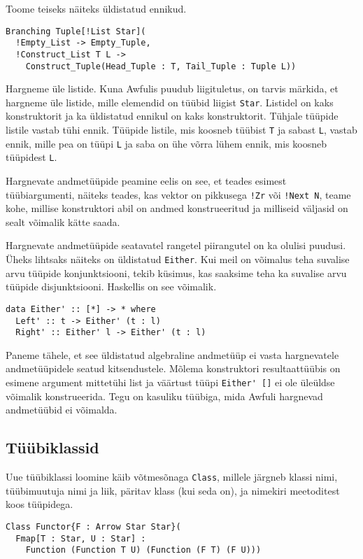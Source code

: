 \documentclass[12pt]{article}
\begin{document}
        Toome teiseks näiteks üldistatud ennikud.

        \begin{verbatim}Branching Tuple[!List Star](
  !Empty_List -> Empty_Tuple,
  !Construct_List T L ->
    Construct_Tuple(Head_Tuple : T, Tail_Tuple : Tuple L))\end{verbatim}

        Hargneme üle listide. Kuna Awfulis puudub liigituletus, on tarvis märkida, et hargneme üle listide, mille elemendid on tüübid liigist \verb!Star!. Listidel on kaks konstruktorit ja ka üldistatud ennikul on kaks konstruktorit. Tühjale tüüpide listile vastab tühi ennik. Tüüpide listile, mis koosneb tüübist \verb!T! ja sabast \verb!L!, vastab ennik, mille pea on tüüpi \verb!L! ja saba on ühe võrra lühem ennik, mis koosneb tüüpidest \verb!L!.

        Hargnevate andmetüüpide peamine eelis on see, et teades esimest tüübiargumenti, näiteks teades, kas vektor on pikkusega \verb"!Zr" või \verb"!Next N", teame kohe, millise konstruktori abil on andmed konstrueeritud ja milliseid väljasid on sealt võimalik kätte saada.

        Hargnevate andmetüüpide seatavatel rangetel piirangutel on ka olulisi puudusi. Üheks lihtsaks näiteks on üldistatud \verb!Either!. Kui meil on võimalus teha suvalise arvu tüüpide konjunktsiooni, tekib küsimus, kas saaksime teha ka suvalise arvu tüüpide disjunktsiooni. Haskellis on see võimalik.

        \begin{verbatim}data Either' :: [*] -> * where
  Left' :: t -> Either' (t : l)
  Right' :: Either' l -> Either' (t : l)\end{verbatim}

        Paneme tähele, et see üldistatud algebraline andmetüüp ei vasta hargnevatele andmetüüpidele seatud kitsendustele. Mõlema konstruktori resultaattüübis on esimene argument mittetühi list ja väärtust tüüpi \verb!Either' []! ei ole üleüldse võimalik konstrueerida. Tegu on kasuliku tüübiga, mida Awfuli hargnevad andmetüübid ei võimalda.
    \subsection{Tüübiklassid}
      Uue tüübiklassi loomine käib võtmesõnaga \verb!Class!, millele järgneb klassi nimi, tüübimuutuja nimi ja liik, päritav klass (kui seda on), ja nimekiri meetoditest koos tüüpidega.

      \begin{verbatim}Class Functor{F : Arrow Star Star}(
  Fmap[T : Star, U : Star] :
    Function (Function T U) (Function (F T) (F U)))\end{verbatim}
\end{document}
